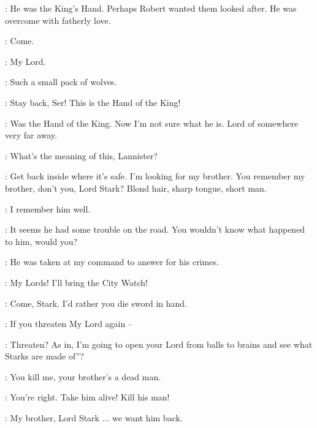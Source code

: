 \LITTLEFINGER: He was the King's Hand. Perhaps Robert wanted them looked after. He was overcome with fatherly love. 

\NED:  Come. 

\JORY: My Lord. 


\JAIME: Such a small pack of wolves. 

\JORY: Stay back, Ser! This is the Hand of the King! 

\JAIME: Was the Hand of the King. Now I'm not sure what he is. Lord of somewhere very far away. 

\LITTLEFINGER:  What's the meaning of this, Lannister? 

\JAIME: Get back inside where it's safe. I'm looking for my brother. You remember my brother, don't you, Lord Stark? Blond hair, sharp tongue, short man. 

\NED: I remember him well. 

\JAIME: It seems he had some trouble on the road. You wouldn't know what happened to him, would you? 

\NED: He was taken at my command to answer for his crimes. 


\LITTLEFINGER: My Lords! I'll bring the City Watch! 

\JAIME: Come, Stark. I'd rather you die sword in hand. 

\JORY: If you threaten My Lord again -- 

\JAIME: Threaten? As in, I'm going to open your Lord from balls to brains and see what Starks are made of''? 

\NED: You kill me, your brother's a dead man. 

\JAIME: You're right.  Take him alive! Kill his man! 


\JAIME: My brother, Lord Stark $\ldots$ we want him back. 



